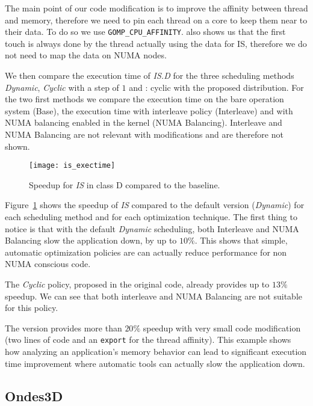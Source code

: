 The main point of our code modification is to improve the affinity between
thread and memory, therefore we need to pin each thread on a core to keep them
near to their data. To do so we use \texttt{GOMP\_CPU\_AFFINITY}. \TABARNAC
also shows us that the first touch is always done by the thread actually using
the data for IS, therefore we do not need to map the data on NUMA nodes.

We then compare the execution time of \emph{IS.D} for the three scheduling
methods \emph{Dynamic}, \emph{Cyclic} with a step of $1$ and \TABARNAC:
cyclic with the proposed distribution. For the two first methods we compare the
execution time on the bare operation system (Base), the execution time with
interleave policy (Interleave) and with NUMA balancing enabled in the kernel
(NUMA Balancing). Interleave and NUMA Balancing are not relevant with
\TABARNAC modifications and are therefore not shown.

\begin{figure}[htb]
    \centering
    \texttt{[image: is\_exectime]}
    \caption{Speedup for \emph{IS} in class D compared to the baseline.}
\label{fig:is-res}
\end{figure}

Figure~\ref{fig:is-res} shows the speedup of \emph{IS} compared to
the default version (\emph{Dynamic}) for each scheduling method and for each
optimization technique. The first thing to notice is that with the default
\emph{Dynamic} scheduling, both Interleave and NUMA Balancing slow
the application down, by up to $10\%$. This shows that simple, automatic optimization policies are can actually reduce performance
for non NUMA conscious code.

The \emph{Cyclic} policy, proposed in the original code, already provides up to $13\%$
speedup. We can see that both interleave and NUMA Balancing are not suitable
for this policy.

The \TABARNAC version provides more than $20\%$ speedup with very small code
modification (two lines of code and an \texttt{export} for the thread affinity).
This example shows how analyzing an application's memory behavior can lead to
significant execution time improvement where automatic tools can actually slow
the application down.

\subsection{Ondes3D}
\label{sec:exp-ondes3d}

